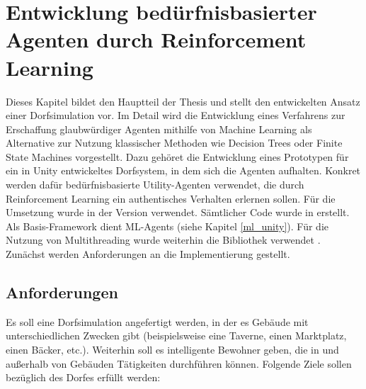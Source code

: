 \chapter{Entwicklung bedürfnisbasierter Agenten durch Reinforcement Learning}\label{entwicklung_dorf}
Dieses Kapitel bildet den Hauptteil der Thesis und stellt den entwickelten Ansatz einer Dorfsimulation vor. Im Detail wird die Entwicklung eines Verfahrens zur Erschaffung glaubwürdiger Agenten mithilfe von Machine Learning als Alternative zur Nutzung klassischer Methoden wie Decision Trees oder Finite State Machines vorgestellt. Dazu gehöret die Entwicklung eines Prototypen für ein in Unity entwickeltes Dorfsystem, in dem sich die Agenten aufhalten. Konkret werden dafür bedürfnisbasierte Utility-Agenten verwendet, die durch Reinforcement Learning ein authentisches Verhalten erlernen sollen.
Für die Umsetzung wurde  in der Version  verwendet. Sämtlicher Code wurde in  erstellt. Als Basis-Framework dient ML-Agents (siehe Kapitel \ref{ml_unity}). Für die Nutzung von Multithreading wurde weiterhin die Bibliothek  verwendet \cite{ninja}. Zunächst werden Anforderungen an die Implementierung gestellt.


\section{Anforderungen}
Es soll eine Dorfsimulation angefertigt werden, in der es Gebäude mit unterschiedlichen Zwecken gibt (beispielsweise eine Taverne, einen Marktplatz, einen Bäcker, etc.). Weiterhin soll es intelligente Bewohner geben, die in und außerhalb von Gebäuden Tätigkeiten durchführen können.
Folgende Ziele sollen bezüglich des Dorfes erfüllt werden:

